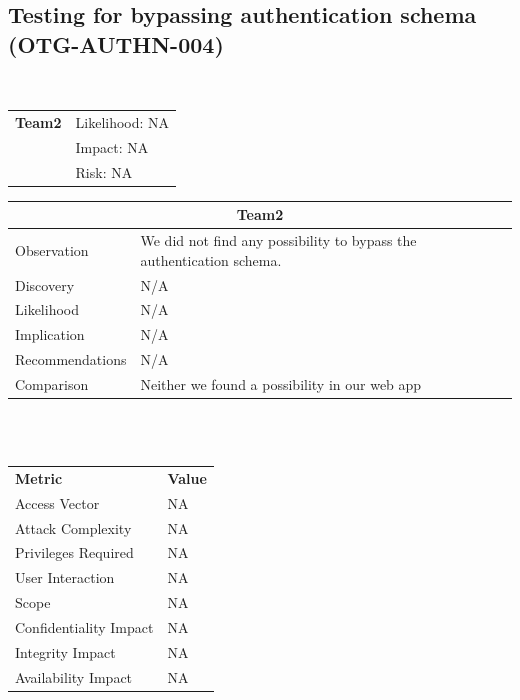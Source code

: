 \documentclass[headsepline,footsepline,footinclude=false,oneside,fontsize=11pt,paper=a4,listof=totoc,bibliography=totoc]{scrbook} %
\begin{document}
\pagebreak
\subsection{Testing for bypassing authentication schema (OTG-AUTHN-004)}\

\begin{tabular}{cR{12cm}}
	\textbf{Team2} & Likelihood: NA\\& Impact: NA\\& Risk: NA
\end{tabular}

\begin{tabular}{ l|p{11cm}  }
	\hline
	\multicolumn{2}{c}{\textbf{Team2}} \\
	\hline
	Observation &  We did not find any possibility to bypass the authentication schema.\\
	Discovery & N/A\\
	Likelihood & N/A\\
	Implication & N/A\\
	Recommendations & N/A\\
	Comparison & Neither we found a possibility in our web app \\
	\hline
\end{tabular}
\\
\vspace{0.5cm}
\\
\begin{center}
	\begin{tabular}{ll}
		\rowcolor[HTML]{34CDF9}
		{\color[HTML]{ECF4FF} \textbf{Metric}}        & {\color[HTML]{ECF4FF} \textbf{Value}} \\
		\rowcolor[HTML]{BBDAFF}
		{\color[HTML]{333333} Access Vector}          & {\color[HTML]{333333} } NA              \\
		\rowcolor[HTML]{ECF4FF}
		{\color[HTML]{333333} Attack Complexity}      & {\color[HTML]{333333} } NA              \\
		\rowcolor[HTML]{BBDAFF}
		{\color[HTML]{333333} Privileges Required}    & {\color[HTML]{333333} } NA              \\
		\rowcolor[HTML]{ECF4FF}
		{\color[HTML]{333333} User Interaction}       & {\color[HTML]{333333} } NA              \\
		\rowcolor[HTML]{BBDAFF}
		{\color[HTML]{333333} Scope}                  & {\color[HTML]{333333} } NA              \\
		\rowcolor[HTML]{ECF4FF}
		{\color[HTML]{333333} Confidentiality Impact} & {\color[HTML]{333333} } NA              \\
		\rowcolor[HTML]{BBDAFF}
		{\color[HTML]{333333} Integrity Impact}       & {\color[HTML]{333333} } NA              \\
		\rowcolor[HTML]{ECF4FF}
		{\color[HTML]{333333} Availability Impact}    & {\color[HTML]{333333} } NA
	\end{tabular}
\end{center}
\end{document}
